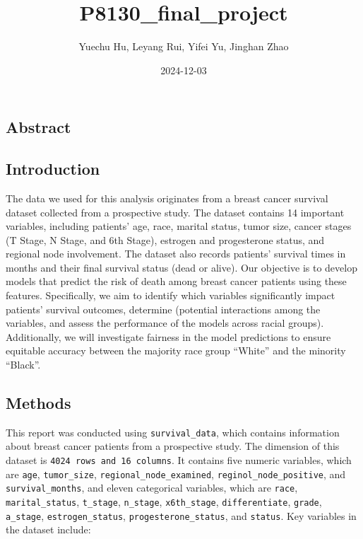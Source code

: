 \documentclass[
]{article}
\title{P8130\_final\_project}
\author{Yuechu Hu, Leyang Rui, Yifei Yu, Jinghan Zhao}
\date{2024-12-03}
\begin{document}
\maketitle

\subsection{Abstract}\label{abstract}

\subsection{Introduction}\label{introduction}

The data we used for this analysis originates from a breast cancer
survival dataset collected from a prospective study. The dataset
contains 14 important variables, including patients' age, race, marital
status, tumor size, cancer stages (T Stage, N Stage, and 6th Stage),
estrogen and progesterone status, and regional node involvement. The
dataset also records patients' survival times in months and their final
survival status (dead or alive). Our objective is to develop models that
predict the risk of death among breast cancer patients using these
features. Specifically, we aim to identify which variables significantly
impact patients' survival outcomes, determine (potential interactions
among the variables, and assess the performance of the models across
racial groups). Additionally, we will investigate fairness in the model
predictions to ensure equitable accuracy between the majority race group
``White'' and the minority ``Black''.

\subsection{Methods}\label{methods}

This report was conducted using \texttt{survival\_data}, which contains
information about breast cancer patients from a prospective study. The
dimension of this dataset is \texttt{4024 rows and 16 columns}. It
contains five numeric variables, which are \texttt{age},
\texttt{tumor\_size}, \texttt{regional\_node\_examined},
\texttt{reginol\_node\_positive}, and \texttt{survival\_months}, and
eleven categorical variables, which are \texttt{race},
\texttt{marital\_status}, \texttt{t\_stage}, \texttt{n\_stage},
\texttt{x6th\_stage}, \texttt{differentiate}, \texttt{grade},
\texttt{a\_stage}, \texttt{estrogen\_status},
\texttt{progesterone\_status}, and \texttt{status}. Key variables in the
dataset include:
\end{document}
